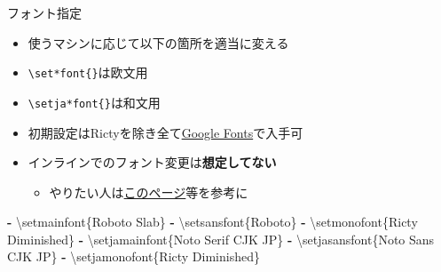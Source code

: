 \documentclass[
  12pt,
  ignorenonframetext,
]{beamer}
\newenvironment{Shaded}{\begin{snugshade}}{\end{snugshade}}
\newcommand{\AttributeTok}[1]{\textcolor[rgb]{0.77,0.63,0.00}{#1}}
\newcommand{\KeywordTok}[1]{\textcolor[rgb]{0.13,0.29,0.53}{\textbf{#1}}}
\providecommand{\tightlist}{%
  \setlength{\itemsep}{0pt}\setlength{\parskip}{0pt}}
\begin{document}
\begin{frame}[fragile]{フォント指定}
\protect\hypertarget{ux30d5ux30a9ux30f3ux30c8ux6307ux5b9a}{}

\begin{itemize}
\tightlist
\item
  使うマシンに応じて以下の箇所を適当に変える
\item
  \texttt{\textbackslash{}set*font\{\}}は欧文用
\item
  \texttt{\textbackslash{}setja*font\{\}}は和文用
\item
  初期設定はRictyを除き全て\href{https://fonts.google.com/?category=Sans+Serif\#standard-styles}{Google
  Fonts}で入手可
\item
  インラインでのフォント変更は\textbf{想定してない}

  \begin{itemize}
  \tightlist
  \item
    やりたい人は\href{https://astr.phys.saga-u.ac.jp/~funakubo/research/recipe/xelatex-presen.html}{このページ}等を参考に
  \end{itemize}
\end{itemize}

\begin{Shaded}
\begin{Highlighting}[]
\KeywordTok{-}\AttributeTok{ \textbackslash{}setmainfont\{Roboto Slab\}}
\KeywordTok{-}\AttributeTok{ \textbackslash{}setsansfont\{Roboto\}}
\KeywordTok{-}\AttributeTok{ \textbackslash{}setmonofont\{Ricty Diminished\}}
\KeywordTok{-}\AttributeTok{ \textbackslash{}setjamainfont\{Noto Serif CJK JP\}}
\KeywordTok{-}\AttributeTok{ \textbackslash{}setjasansfont\{Noto Sans CJK JP\}}
\KeywordTok{-}\AttributeTok{ \textbackslash{}setjamonofont\{Ricty Diminished\}}
\end{Highlighting}
\end{Shaded}

\end{frame}
\end{document}
